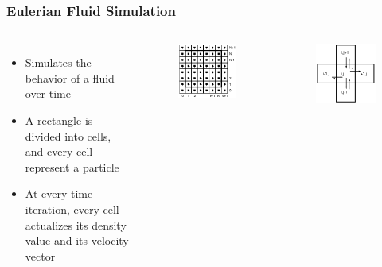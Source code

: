 \documentclass{beamer}\usetheme{Madrid} %
\begin{document}
\begin{frame}
\frametitle { Eulerian Fluid Simulation }
\begin{columns} 
\begin{itemize}
	\item
		Simulates the behavior of a fluid over time
	\item
		A rectangle is divided into cells, and every cell represent a 
		particle
	\item
		At every time iteration, every cell actualizes its density value
		and its velocity vector
\end{itemize}
\begin{figure}
        \includegraphics[scale=0.18]{img/eul1.png}
    \end{figure}
\begin{figure}
        \includegraphics[scale=0.18]{img/eul3.png}

\end{figure}
\end{columns}
\end{frame}
\end{document}
